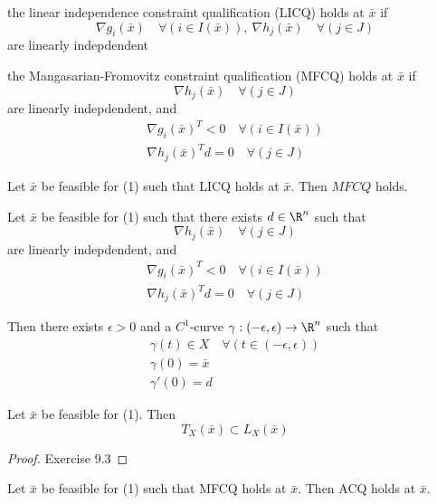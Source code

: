 \begin{enumerata}
	\item the linear independence constraint qualification (LICQ) holds
	at $\bar x$ if
	$$
		\nabla g_i(\bar x)\quad\forall(i\in I(\bar x)),\ \nabla h_j(\bar x)\quad\forall(j\in J)
	$$
	are linearly indepdendent
	\item the Mangasarian-Fromovitz constraint qualification (MFCQ)
	holds at $\bar x$ if
	$$
		\nabla h_j(\bar x)\quad\forall(j\in J)
	$$
	are linearly indepdendent, and
	\begin{gather*}
		\nabla g_i(\bar x)^T < 0  \quad\forall(i\in I(\bar x))\\
		\nabla h_j(\bar x)^Td = 0 \quad\forall(j\in J)
	\end{gather*}
\end{enumerata}

\label{a7ef3f5}

Let $\bar x$ be feasible for (1) such that LICQ holds at $\bar x$.
Then $MFCQ$ holds.

\label{a9bea04}

Let $\bar x$ be feasible for (1) such that there exists $d\in\R^n$
such that
$$
	\nabla h_j(\bar x)\quad\forall(j\in J)
$$
are linearly indepdendent, and
\begin{gather*}
	\nabla g_i(\bar x)^T < 0  \quad\forall(i\in I(\bar x))\\
	\nabla h_j(\bar x)^Td = 0 \quad\forall(j\in J)
\end{gather*}

Then there exists $\epsilon>0$ and a $C^1$-curve
$\gamma:(-\epsilon,\epsilon)\to\R^n$ such that
\begin{gather*}
	\gamma(t) \in X\quad\forall(t\in(-\epsilon,\epsilon)) \\
	\gamma(0) = \bar x \\
	\gamma'(0)=d
\end{gather*}

\label{a08cd35}

Let $\bar x$ be feasible for (1). Then
$$
	T_X(\bar x)\subset L_X(\bar x)
$$

\begin{proof}
	Exercise 9.3
\end{proof}

\label{eddce03}

Let $\bar x$ be feasible for (1) such that MFCQ holds at $\bar x$.
Then ACQ holds at $\bar x$.

